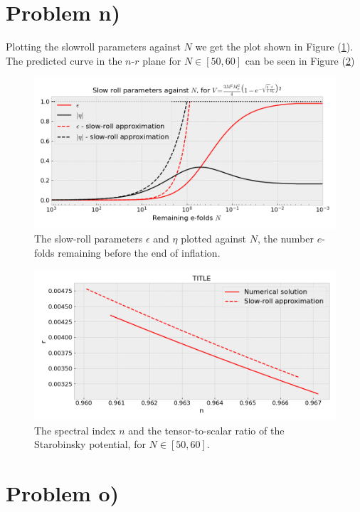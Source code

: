 \documentclass[reprint,english,notitlepage]{revtex4-1}  %
\numberwithin{equation}{section}
\begin{document}
\section{Problem n)}
Plotting the slowroll parameters against $N$ we get the plot shown in Figure
(\ref{fig:starobinsky_slowroll-N}). The predicted curve in the $n$-$r$ plane for
$N\in[50,60]$ can be seen in Figure (\ref{fig:starobinsky_slowroll-nr})

\begin{figure}[h!]
	\includegraphics[width=\linewidth]{StarobinskyPotential_slowroll-N.png}
	\caption{The slow-roll parameters $\epsilon$ and $\eta$ plotted against
	$N$, the number $e$-folds remaining before the end of inflation.}
	\label{fig:starobinsky_slowroll-N}
\end{figure}


\begin{figure}[h!]
	\includegraphics[width=\linewidth]{StarobinskyPotential_slowroll-nr.png}
	\caption{The spectral index $n$ and the tensor-to-scalar ratio of the
	Starobinsky potential, for $N\in[50,60]$.}
	\label{fig:starobinsky_slowroll-nr}
\end{figure}

\section{Problem o)}
\end{document}
